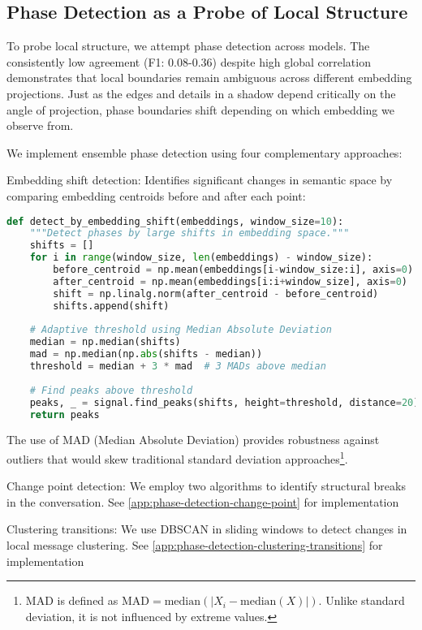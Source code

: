 \documentclass[11pt,letterpaper]{article}
\begin{document}
\subsection{Phase Detection as a Probe of Local Structure}

To probe local structure, we attempt phase detection across models. The consistently low agreement (F1: 0.08-0.36) despite high global correlation demonstrates that local boundaries remain ambiguous across different embedding projections. Just as the edges and details in a shadow depend critically on the angle of projection, phase boundaries shift depending on which embedding we observe from.

We implement ensemble phase detection using four complementary approaches:

Embedding shift detection: Identifies significant changes in semantic space by comparing embedding centroids before and after each point:

\begin{lstlisting}[language=Python]
def detect_by_embedding_shift(embeddings, window_size=10):
    """Detect phases by large shifts in embedding space."""
    shifts = []
    for i in range(window_size, len(embeddings) - window_size):
        before_centroid = np.mean(embeddings[i-window_size:i], axis=0)
        after_centroid = np.mean(embeddings[i:i+window_size], axis=0)
        shift = np.linalg.norm(after_centroid - before_centroid)
        shifts.append(shift)
    
    # Adaptive threshold using Median Absolute Deviation
    median = np.median(shifts)
    mad = np.median(np.abs(shifts - median))
    threshold = median + 3 * mad  # 3 MADs above median
    
    # Find peaks above threshold
    peaks, _ = signal.find_peaks(shifts, height=threshold, distance=20)
    return peaks
\end{lstlisting}

The use of MAD (Median Absolute Deviation) provides robustness against outliers that would skew traditional standard deviation approaches\footnote{MAD is defined as $\text{MAD} = \text{median}(|X_i - \text{median}(X)|)$. Unlike standard deviation, it is not influenced by extreme values.}.

Change point detection: We employ two algorithms to identify structural breaks in the conversation. See \ref{app:phase-detection-change-point} for implementation

Clustering transitions: We use DBSCAN in sliding windows to detect changes in local message clustering. See \ref{app:phase-detection-clustering-transitions} for implementation
\end{document}
